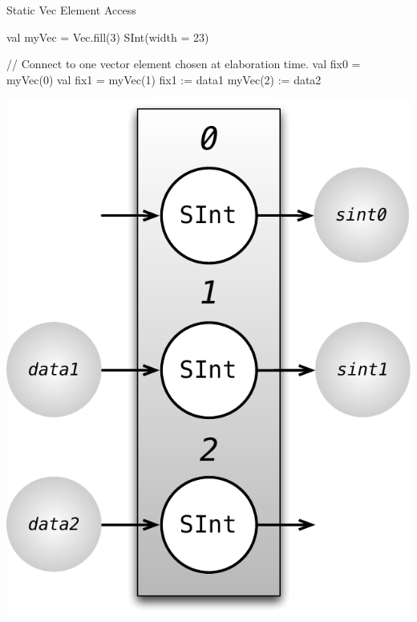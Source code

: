 \documentclass[xcolor=pdflatex,dvipsnames,table]{beamer}
\begin{document}
\begin{frame}[fragile]{Static Vec Element Access}
\begin{scala}
val myVec = Vec.fill(3) { SInt(width = 23) } 

// Connect to one vector element chosen at elaboration time.
val fix0  = myVec(0)
val fix1  = myVec(1)
fix1     := data1 
myVec(2) := data2
\end{scala}

\begin{center}
\includegraphics[height=0.5\textheight]{figs/vec-3-static.pdf} 
\end{center}
\end{frame}
\end{document}
